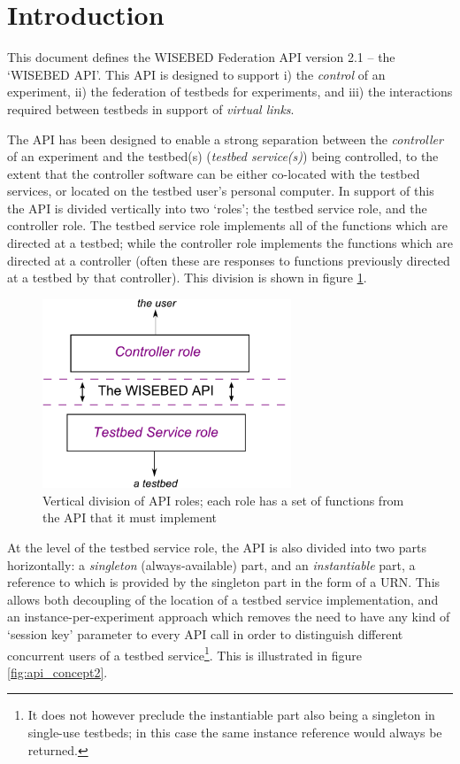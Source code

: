 \section{Introduction}

This document defines the WISEBED Federation API version 2.1 -- the `WISEBED API'. This API is designed to support i) the {\em control} of an experiment, ii) the federation of testbeds for experiments, and iii) the interactions required between testbeds in support of {\em virtual links}.

The API has been designed to enable a strong separation between the {\em controller} of an experiment and the testbed(s) ({\em testbed service(s)}) being controlled, to the extent that the controller software can be either co-located with the testbed services, or located on the testbed user's personal computer. In support of this the API is divided vertically into two `roles'; the testbed service role, and the controller role. The testbed service role implements all of the functions which are directed at a testbed; while the controller role implements the functions which are directed at a controller (often these are responses to functions previously directed at a testbed by that controller). This division is shown in figure \ref{fig:api_concept}. %

\begin{figure}[htb]
\centering
\includegraphics[height=160pt]{images/APIconcept}
\caption{Vertical division of API roles; each role has a set of functions from the API that it must implement}
\label{fig:api_concept}
\end{figure}

At the level of the testbed service role, the API is also divided into two parts horizontally: a {\em singleton} (always-available) part, and an {\em instantiable} part, a reference to which is provided by the singleton part in the form of a URN. This allows both decoupling of the location of a testbed service implementation, and an instance-per-experiment approach which removes the need to have any kind of `session key' parameter to every API call in order to distinguish different concurrent users of a testbed service\footnote{It does not however preclude the instantiable part also being a singleton in single-use testbeds; in this case the same instance reference would always be returned.}. This is illustrated in figure \ref{fig:api_concept2}.


